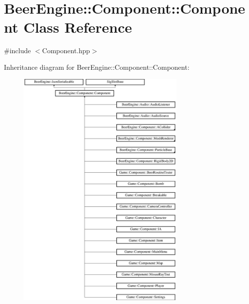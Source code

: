 \hypertarget{class_beer_engine_1_1_component_1_1_component}{}\section{Beer\+Engine\+:\+:Component\+:\+:Component Class Reference}
\label{class_beer_engine_1_1_component_1_1_component}


{\ttfamily \#include $<$Component.\+hpp$>$}

Inheritance diagram for Beer\+Engine\+:\+:Component\+:\+:Component\+:\begin{figure}[H]
\begin{center}
\leavevmode
\includegraphics[height=12.000000cm]{class_beer_engine_1_1_component_1_1_component}
\end{center}
\end{figure}
